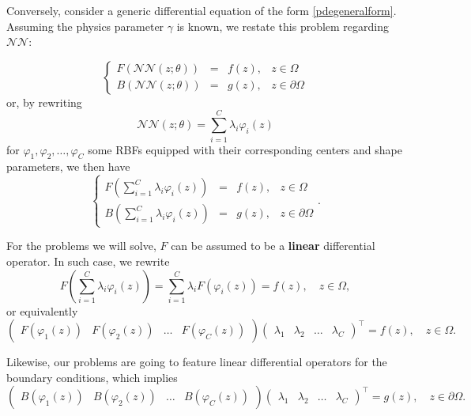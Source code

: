 \documentclass[12pt]{report} %
\newcommand{\tmstrong}[1]{\textbf{#1}}
\begin{document}
Conversely, consider a generic differential equation of the form \eqref{pdegeneralform}. Assuming the physics parameter $\gamma$ is known, we restate this problem regarding $\mathcal{NN}$:

\[ \left\{\begin{array}{rlll}
     F (\mathcal{N}\mathcal{N} (z ; \theta)) & = & f (z), & z \in \Omega\\
     B (\mathcal{N}\mathcal{N} (z ; \theta)) & = & g (z), & z \in \partial
     \Omega
   \end{array}\right. \]
or, by rewriting
\[ \mathcal{N}\mathcal{N} (z ; \theta) = \sum_{i = 1}^C \lambda_i \varphi_i
   (z) \]
for $\varphi_1, \varphi_2, \ldots, \varphi_C$ some RBFs equipped with their
corresponding centers and shape parameters, we then have
\[ \left\{\begin{array}{llll}
     F \left( \sum_{i = 1}^C \lambda_i \varphi_i (z) \right) & = & f (z), & z
     \in \Omega\\
     B \left( \sum_{i = 1}^C \lambda_i \varphi_i (z) \right) & = & g (z), & z
     \in \partial \Omega
   \end{array}\right. . \]

For the problems we will solve, $F$ can be assumed to be a {\tmstrong{linear}}
differential operator. In such case, we rewrite
\[ F \left( \sum_{i = 1}^C \lambda_i \varphi_i (z) \right) = \sum_{i = 1}^C
   \lambda_i F (\varphi_i (z)) = f (z), \quad z \in \Omega, \]
or equivalently
\[ \left(\begin{array}{cccc}
     F (\varphi_1 (z)) & F (\varphi_2 (z)) & \ldots & F (\varphi_C (z))
   \end{array}\right) \left(\begin{array}{cccc}
     \lambda_1 & \lambda_2 & \ldots & \lambda_C
   \end{array}\right)^{\top} = f (z), \quad z \in \Omega . \]

Likewise, our problems are going to feature linear differential operators for
the boundary conditions, which implies
\[ \left(\begin{array}{cccc}
     B (\varphi_1 (z)) & B (\varphi_2 (z)) & \ldots & B (\varphi_C (z))
   \end{array}\right) \left(\begin{array}{cccc}
     \lambda_1 & \lambda_2 & \ldots & \lambda_C
   \end{array}\right)^{\top} = g (z), \quad z \in \partial \Omega . \]
\end{document}
